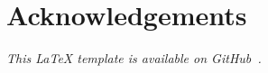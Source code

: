 \maketitle
\setcounter{tocdepth}{2}
\tableofcontents

\section*{Acknowledgements}\label{sec:acknowledgements}
\lipsum[1]

\vfill
\begin{center}
    \textit{This \LaTeX{} template is available on GitHub~\cite{TexTemplate}.}
\end{center}
\newpage